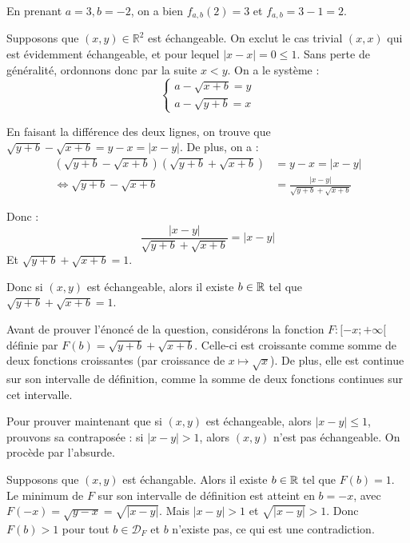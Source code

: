 \documentclass[]{../templates/homework}
\begin{document}
\subproblem
En prenant $a = 3, b=-2$, on a bien $f_{a,b}(2) = 3$ et $f_{a,b} = 3-1 = 2$.
\subproblem

Supposons que $(x,y) \in \mathbb R^2$ est échangeable. On exclut le cas trivial $(x,x)$ qui est évidemment échangeable, et pour lequel $|x-x| = 0 \leq 1$. Sans perte de généralité, ordonnons donc par la suite $x < y$. On a le système :
\begin{equation*}
	\begin{cases}
		a - \sqrt{x+b} = y \\
		a - \sqrt{y+b} = x
	\end{cases}
\end{equation*}

En faisant la différence des deux lignes, on trouve que $\sqrt{y+b} - \sqrt{x+b} = y-x = |x-y|$. De plus, on a :
\begin{equation*}
	\begin{split}
		(\sqrt{y+b} - \sqrt{x+b})(\sqrt{y+b} + \sqrt{x+b}) & =y-x = |x-y|                             \\
		\iff \sqrt{y+b} - \sqrt{x+b}                       & = \frac {|x-y|}{\sqrt{y+b} + \sqrt{x+b}}
	\end{split}
\end{equation*}

Donc : $$\frac {|x-y|}{\sqrt{y+b} + \sqrt{x+b}} = |x-y|$$
Et $\sqrt{y+b} + \sqrt{x+b} = 1$.

Donc si $(x,y)$ est échangeable, alors il existe $b\in\mathbb R$ tel que $\sqrt{y+b} + \sqrt{x+b} = 1$.

Avant de prouver l'énoncé de la question, considérons la fonction $F: [-x;+\infty[$ définie par $F(b) = \sqrt{y+b} + \sqrt{x+b}$. Celle-ci est croissante comme somme de deux fonctions croissantes (par croissance de $x\mapsto \sqrt x$). De plus, elle est continue sur son intervalle de définition, comme la somme de deux fonctions continues sur cet intervalle.

Pour prouver maintenant que si $(x,y)$ est échangeable, alors $|x-y| \leq 1$, prouvons sa contraposée : si $|x-y| > 1$, alors $(x,y)$ n'est pas échangeable. On procède par l'absurde.

Supposons que $(x,y)$ est échangable. Alors il existe $b\in\mathbb R$ tel que $F(b) = 1$. Le minimum de $F$ sur son intervalle de définition est atteint en $b=-x$, avec $F(-x) = \sqrt{y-x} = \sqrt{|x-y|}$. Mais $|x-y| > 1$ et $\sqrt{|x-y|} > 1$. Donc $F(b) > 1$ pour tout $b\in \mathcal D_F$ et $b$ n'existe pas, ce qui est une contradiction.
\end{document}
